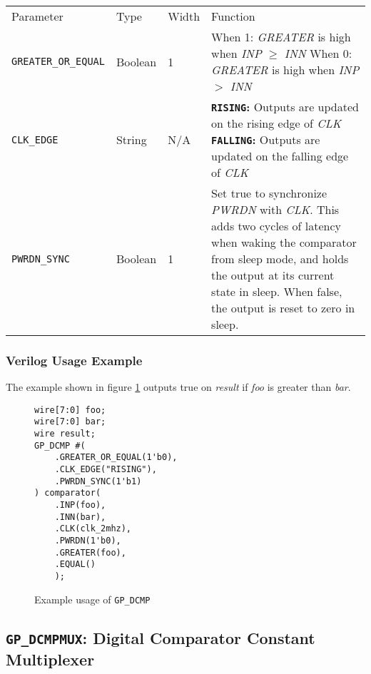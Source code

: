 \documentclass[11pt]{article}
\newcommand{\namestyle}[1]{\textit{#1}}
\newcommand{\tokenstyle}[1]{\texttt{#1}}
\newcommand{\valuestyle}[1]{\texttt{#1}}
\newcommand{\strvaluestyle}[1]{\valuestyle{\textquotedbl#1\textquotedbl}}
\newcommand{\strexamplestyle}[1]{\textbf{\strvaluestyle{#1}:}}
\newcommand{\whenstyle}[1]{{\fontseries{sb}\selectfont#1}}
\newcommand{\thinhline}{\Xhline{1\arrayrulewidth}}
\newcommand{\thickhline}{\Xhline{2.5\arrayrulewidth}}
\begin{document}
\begin{tabularx}{\textwidth}{lllX}
\thinhline
\whenstyle{Parameter} & \whenstyle{Type} & \whenstyle{Width} & \whenstyle{Function} \\
\thickhline
\tokenstyle{GREATER\_OR\_EQUAL} & Boolean & 1 &
	\whenstyle{When 1:} \namestyle{GREATER} is high when \namestyle{INP} $\geq$ \namestyle{INN} \newline
	\whenstyle{When 0:} \namestyle{GREATER} is high when \namestyle{INP} $>$ \namestyle{INN} \\
\thinhline
\tokenstyle{CLK\_EDGE} & String & N/A &
	\strexamplestyle{RISING} Outputs are updated on the rising edge of \namestyle{CLK} \newline
	\strexamplestyle{FALLING} Outputs are updated on the falling edge of \namestyle{CLK} \\
\thinhline
\tokenstyle{PWRDN\_SYNC} & Boolean & 1 & Set true to synchronize \namestyle{PWRDN} with \namestyle{CLK}. This adds two
cycles of latency when waking the comparator from sleep mode, and holds the output at its current state in sleep. When false,
the output is reset to zero in sleep. \\
\end{tabularx}

\subsubsection{Verilog Usage Example}

The example shown in figure \ref{gp-dcmp-example} outputs true on \namestyle{result} if \namestyle{foo} is greater than
\namestyle{bar}.

\begin{figure}[h]
\begin{lstlisting}
wire[7:0] foo;
wire[7:0] bar;
wire result;
GP_DCMP #(
	.GREATER_OR_EQUAL(1'b0),
	.CLK_EDGE("RISING"),
	.PWRDN_SYNC(1'b1)
) comparator(
	.INP(foo),
	.INN(bar),
	.CLK(clk_2mhz),
	.PWRDN(1'b0),
	.GREATER(foo),
	.EQUAL()
	);
\end{lstlisting}
\caption{Example usage of \tokenstyle{GP\_DCMP}}
\label{gp-dcmp-example}
\end{figure}


\pagebreak
\subsection{\tokenstyle{GP\_DCMPMUX}: Digital Comparator Constant Multiplexer}
\label{gp-dcmpmux}
\end{document}
